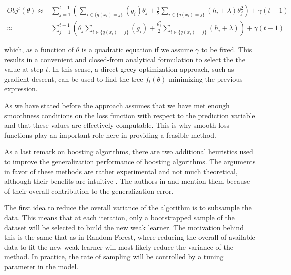 \begin{equation} \label{eq:gb-objSteps1}
\begin{split}
Obj^t(\theta) \approx  & \sum_{j=1}^{t-1} \left(  \sum_{i \in \{q(x_i)=j\}} (g_i )\theta_{j} + \frac{1}{2} \sum_{i \in \{q(x_i)=j\}} (h_i + \lambda ) \theta_{j}^2  \right) + \gamma ({t-1}) \\
\approx  & \sum_{j=1}^{t-1} \left(  \theta_{j}\sum_{i \in \{q(x_i)=j\}} (g_i ) + \frac{\theta_{j}^2}{2} \sum_{i \in \{q(x_i)=j\}} (h_i + \lambda )  \right) + \gamma ({t-1})
\end{split}
\end{equation}

which, as a function of $\theta$ is a quadratic equation if we assume $\gamma$ to be fixed. This results in a convenient and closed-from analytical formulation to select the the value at step $t$. In this sense, a direct greey optimization approach, such as gradient descent, can be used to find the tree $f_t(\theta)$ minimizing the previous expression.

As we have stated before the approach assumes that we have met enough smoothness conditions on the loss function with respect to the prediction variable
and that these values are effectively computable. This is why smooth loss functions play an important role here in providing a feasible method.




As a last remark on boosting algorithms, there are two additional heuristics used to improve the generalization performance of boosting algorithms. The arguments in favor of these methods are rather experimental and not much theoretical, although their benefits are intuitive . The authors in \textcite{hastie-elemstatslearn} and \textcite{bishop-patternRecognition} mention them because of their overall contribution to the generalization error.

The first idea to reduce the overall variance of the algorithm is to subsample the data. This means that at each iteration, only a bootstrapped sample of the dataset will be selected to build the new weak learner. The motivation behind this is the same that as in Random Forest, where reducing the overall of available data to fit the new weak learner will most likely reduce the variance of the method. In practice, the rate of sampling will be controlled by a tuning parameter in the model.

